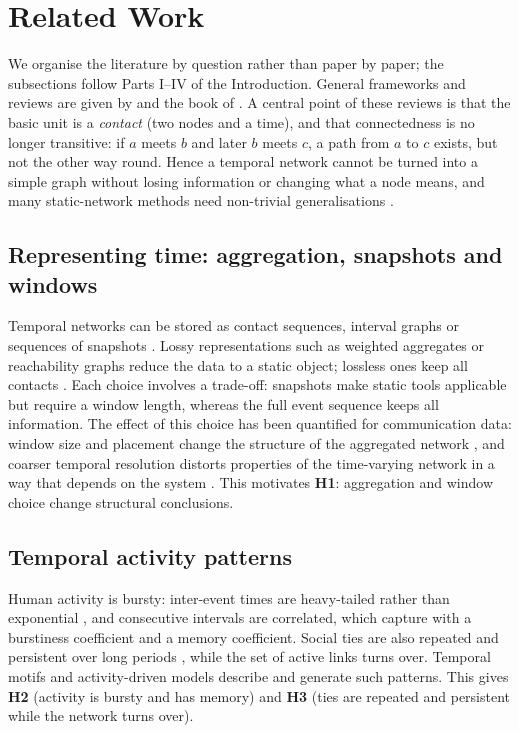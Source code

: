 \section{Related Work}
\label{sec:related}
We organise the literature by question rather than paper by paper; the subsections
follow Parts I--IV of the Introduction. General frameworks and reviews are given by
\citet{holme2012temporal,holme2015modern} and the book of \citet{masuda2016guide}.
A central point of these reviews is that the basic unit is a \emph{contact}
(two nodes and a time), and that connectedness is no longer transitive: if $a$ meets
$b$ and later $b$ meets $c$, a path from $a$ to $c$ exists, but not the other way
round. Hence a temporal network cannot be turned into a simple graph without losing
information or changing what a node means, and many static-network methods need
non-trivial generalisations \citep{holme2015modern}.

\subsection{Representing time: aggregation, snapshots and windows}
\label{sec:rw-representation}
Temporal networks can be stored as contact sequences, interval graphs or sequences of
snapshots \citep{holme2012temporal}. Lossy representations such as weighted aggregates or reachability graphs reduce the
data to a static object; lossless ones keep all contacts \citep{holme2015modern}.
Each choice involves a trade-off: snapshots
make static tools applicable but require a window length, whereas the full event
sequence keeps all information. The effect of this choice has been quantified for
communication data: window size and placement change the structure of the aggregated
network \citep{krings2012effects}, and coarser temporal resolution distorts
properties of the time-varying network in a way that depends on the system
\citep{ribeiro2013quantifying}. This motivates \textbf{H1}: aggregation and window
choice change structural conclusions.

\subsection{Temporal activity patterns}
\label{sec:rw-activity}
Human activity is bursty: inter-event times are heavy-tailed rather than exponential
\citep{barabasi2005origin}, and consecutive intervals are correlated, which
\citet{goh2008burstiness} capture with a burstiness coefficient and a memory
coefficient. Social ties are also repeated and persistent over long periods
\citep{saramaki2014persistence}, while the set of active links turns over. Temporal motifs
\citep{kovanen2011temporal,paranjape2017motifs} and activity-driven models
\citep{perra2012activity} describe and generate such patterns. This gives
\textbf{H2} (activity is bursty and has memory) and \textbf{H3} (ties are repeated and
persistent while the network turns over).

